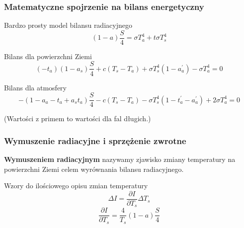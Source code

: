 \documentclass{beamer}
\begin{document}
\begin{frame}
	\frametitle{Matematyczne spojrzenie na bilans energetyczny}
	\begin{block}{Bardzo prosty model bilansu radiacyjnego}
		\[(1-a)\frac{S}{4} = \sigma T_a^4 + t\sigma T_s^4
		\]
	\end{block}
	\begin{block}{Bilans dla powierzchni Ziemi}
		\[(-t_a)(1-a_s)\frac{S}{4}+c(T_s - T_a)+\sigma T_s^4(1-a_a^{'})
		-\sigma T_a^4 =0
		\]
	\end{block}
	\begin{block}{Bilans dla atmosfery}
		\[-(1- a_a-t_a+a_st_a)\frac{S}{4} - c(T_s - T_a) - \sigma T_s^4
		(1-t_a^{'}-a_a^{'}) + 2\sigma T_a^4=0
		\]
	\end{block}
	\scriptsize{(Wartości z primem to wartości dla fal długich.)}
	
\end{frame}


\begin{frame}
	\frametitle{Wymuszenie radiacyjne i sprzężenie zwrotne}
	\textbf{Wymuszeniem radiacyjnym} nazywamy zjawisko zmiany temperatury na powierzchni Ziemi celem wyrównania bilansu radiacyjnego. 
	\begin{block}{Wzory do ilościowego opisu zmian temperatury}
		\[\Delta I = \frac{\partial I}{\partial T_s}\Delta T_s
		\]
		\[\frac{\partial I}{\partial T_s} = \frac{4}{T_s}(1-a)\frac{S}{4}
		\]
		
	\end{block}
\end{frame}
\end{document}
